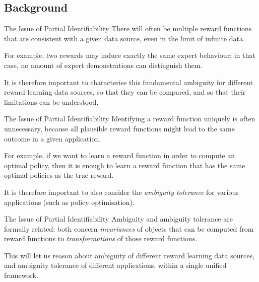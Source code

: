 \documentclass{beamer}
\begin{document}
\subsection{Background}

\begin{frame}{The Issue of Partial Identifiability}
    \small
    There will often be multiple reward functions that are consistent with a given data source, even in the limit of infinite data.
    
    \vspace{0.5cm}
    For example, two rewards may induce exactly the same expert behaviour; in that case, no amount of expert demonstrations can distinguish them. %

    \vspace{0.5cm}
    It is therefore important to characterise this fundamental ambiguity for different reward learning data sources, so that they can be compared, and so that their limitations can be understood.
\end{frame}

\begin{frame}{The Issue of Partial Identifiability}
    \small
    Identifying a reward function uniquely is often unnecessary, because all plausible reward functions might lead to the same outcome in a given application.

    \vspace{0.5cm}
    For example, if we want to learn a reward function in order to compute an optimal policy, then it is enough to learn a reward function that has the same optimal policies as the true reward.

    \vspace{0.5cm}
    It is therefore important to also consider the \emph{ambiguity tolerance} for various applications (such as policy optimisation).
\end{frame}

\begin{frame}{The Issue of Partial Identifiability}
    \small
    Ambiguity and ambiguity tolerance are formally related: both concern \emph{invariances} of objects that can be computed from reward functions to \emph{transformations} of those reward functions.

    \vspace{0.5cm}
    This will let us reason about ambiguity of different reward learning data sources, and ambiguity tolerance of different applications, within a single unified framework.
\end{frame}
\end{document}
